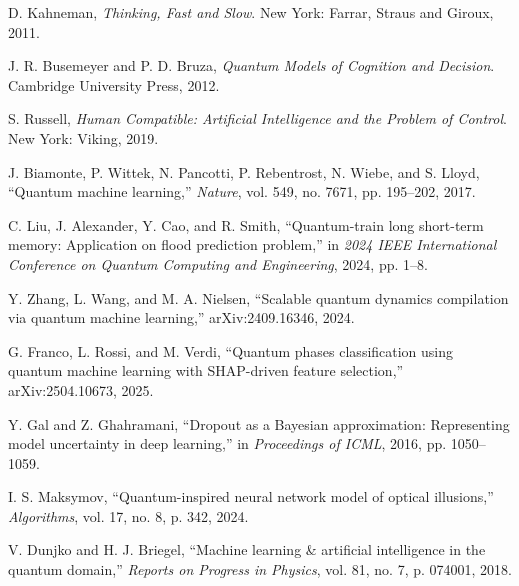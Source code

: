 \documentclass[conference]{IEEEtran}
\begin{document}

\begin{thebibliography}{10}

D. Kahneman, \emph{Thinking, Fast and Slow}. New York: Farrar, Straus and Giroux, 2011.

J. R. Busemeyer and P. D. Bruza, \emph{Quantum Models of Cognition and Decision}. Cambridge University Press, 2012.

S. Russell, \emph{Human Compatible: Artificial Intelligence and the Problem of Control}. New York: Viking, 2019.

J. Biamonte, P. Wittek, N. Pancotti, P. Rebentrost, N. Wiebe, and S. Lloyd, ``Quantum machine learning,'' \emph{Nature}, vol. 549, no. 7671, pp. 195--202, 2017.

C. Liu, J. Alexander, Y. Cao, and R. Smith, ``Quantum-train long short-term memory: Application on flood prediction problem,'' in \emph{2024 IEEE International Conference on Quantum Computing and Engineering}, 2024, pp. 1--8.

Y. Zhang, L. Wang, and M. A. Nielsen, ``Scalable quantum dynamics compilation via quantum machine learning,'' arXiv:2409.16346, 2024.

G. Franco, L. Rossi, and M. Verdi, ``Quantum phases classification using quantum machine learning with SHAP-driven feature selection,'' arXiv:2504.10673, 2025.

Y. Gal and Z. Ghahramani, ``Dropout as a Bayesian approximation: Representing model uncertainty in deep learning,'' in \emph{Proceedings of ICML}, 2016, pp. 1050--1059.

I. S. Maksymov, ``Quantum-inspired neural network model of optical illusions,'' \emph{Algorithms}, vol. 17, no. 8, p. 342, 2024.

V. Dunjko and H. J. Briegel, ``Machine learning \& artificial intelligence in the quantum domain,'' \emph{Reports on Progress in Physics}, vol. 81, no. 7, p. 074001, 2018.

\end{thebibliography}

\balance
\end{document}
